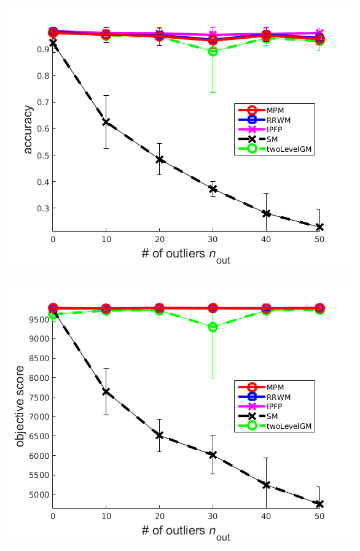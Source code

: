 \begin{figure}
		\begin{subfigure}[b]{0.33\textwidth}
			\centering
			\includegraphics[scale=0.25]{"chapter3/fig/SyntheticTest/no_descr/Results_v4.3.3/Test1/accuracy_avg10t"} 
		\end{subfigure}%
		\begin{subfigure}[b]{0.33\textwidth}
			\centering
			\includegraphics[scale=0.25]{"chapter3/fig/SyntheticTest/no_descr/Results_v4.3.3/Test1/score_avg10t"} 
		\end{subfigure} 
		\begin{subfigure}[b]{0.33\textwidth}
			\centering

\end{subfigure}
\end{figure}
